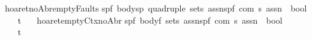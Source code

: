 \begin{isabellebody}
\isanewline
{\isachardoublequoteopen}{\isacharunderscore}hoaret{\isacharunderscore}noAbr{\isacharunderscore}emptyFaults{\isachardoublequoteclose}{\isacharcolon}{\isacharcolon}\isanewline
{\isachardoublequoteopen}{\isacharbrackleft}{\isacharparenleft}{\isacharprime}s{\isacharcomma}{\isacharprime}p{\isacharcomma}{\isacharprime}f{\isacharparenright}\ body{\isacharcomma}{\isacharparenleft}{\isacharprime}s{\isacharcomma}{\isacharprime}p{\isacharparenright}\ quadruple\ set{\isacharcomma}{\isacharprime}s\ assn{\isacharcomma}{\isacharparenleft}{\isacharprime}s{\isacharcomma}{\isacharprime}p{\isacharcomma}{\isacharprime}f{\isacharparenright}\ com{\isacharcomma}\ {\isacharprime}s\ assn{\isacharbrackright}\ {\isacharequal}{\isachargreater}\ bool{\isachardoublequoteclose}\isanewline
\ \ \ {\isacharparenleft}{\isachardoublequoteopen}{\isacharparenleft}{}{\isacharunderscore}{\isacharcomma}{\isacharunderscore}{\isacharslash}{\isacharbar}{\isacharminus}t{\isacharparenleft}{\isacharunderscore}{\isacharslash}\ {\isacharparenleft}{\isacharunderscore}{\isacharparenright}{\isacharslash}\ {\isacharunderscore}{\isacharparenright}{\isacharparenright}{\isachardoublequoteclose}\ {\isacharbrackleft}{}{}{\isacharcomma}{}{}{\isacharcomma}{}{}{}{}{\isacharcomma}{}{}{\isacharcomma}{}{}{}{}{\isacharbrackright}{}{}{\isacharparenright}\isanewline
\isanewline
{\isachardoublequoteopen}{\isacharunderscore}hoaret{\isacharunderscore}emptyCtx{\isacharunderscore}noAbr{\isachardoublequoteclose}{\isacharcolon}{\isacharcolon}\isanewline
{\isachardoublequoteopen}{\isacharbrackleft}{\isacharparenleft}{\isacharprime}s{\isacharcomma}{\isacharprime}p{\isacharcomma}{\isacharprime}f{\isacharparenright}\ body{\isacharcomma}{\isacharprime}f\ set{\isacharcomma}{\isacharprime}s\ assn{\isacharcomma}{\isacharparenleft}{\isacharprime}s{\isacharcomma}{\isacharprime}p{\isacharcomma}{\isacharprime}f{\isacharparenright}\ com{\isacharcomma}\ {\isacharprime}s\ assn{\isacharbrackright}\ {\isacharequal}{\isachargreater}\ bool{\isachardoublequoteclose}\isanewline
\ \ \ {\isacharparenleft}{\isachardoublequoteopen}{\isacharparenleft}{}{\isacharunderscore}{\isacharslash}{\isacharbar}{\isacharminus}t{\isacharprime}{\isacharslash}{\isacharunderscore}\ {\isacharparenleft}{\isacharunderscore}{\isacharslash}\ {\isacharparenleft}{\isacharunderscore}{\isacharparenright}{\isacharslash}\ {\isacharunderscore}{\isacharparenright}{\isacharparenright}{\isachardoublequoteclose}\ {\isacharbrackleft}{}{}{\isacharcomma}{}{}{\isacharcomma}{}{}{}{}{\isacharcomma}{}{}{\isacharcomma}{}{}{}{}{\isacharbrackright}{}{}{\isacharparenright}\isanewline

\end{isabellebody}
